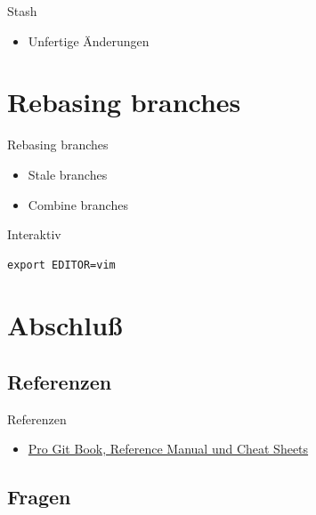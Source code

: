\begin{frame}{Stash}
\begin{itemize}
\item Unfertige Änderungen
\end{itemize}
\end{frame}

\section{Rebasing branches}

\begin{frame}{Rebasing branches}
\begin{itemize}
\item Stale branches
\item Combine branches
\end{itemize}
\end{frame}

\begin{frame}[fragile]{Interaktiv}

\begin{lstlisting}
export EDITOR=vim
\end{lstlisting}
\end{frame}

\section{Abschluß}

\subsection{Referenzen}

\begin{frame}{Referenzen}
\begin{itemize}	
\item \href{https://git-scm.com/doc}{Pro Git Book, Reference Manual und Cheat Sheets}
\end{itemize}
\end{frame}

\subsection{Fragen}

